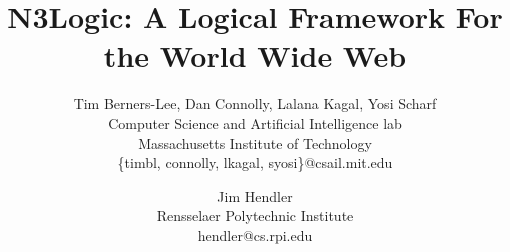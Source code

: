 \documentclass{tlp}
\begin{document}


\long{}


\title{ N3Logic: A Logical Framework For the World Wide Web }

\author[T. Berners-Lee]
{ Tim Berners-Lee, Dan Connolly, Lalana Kagal, Yosi Scharf \\
Computer Science and Artificial Intelligence lab\\
Massachusetts Institute of Technology\\
\{timbl, connolly, lkagal, syosi\}@csail.mit.edu
\and Jim Hendler\\
Rensselaer Polytechnic Institute\\
hendler@cs.rpi.edu
}


\maketitle

\label{firstpage}
\end{document}

